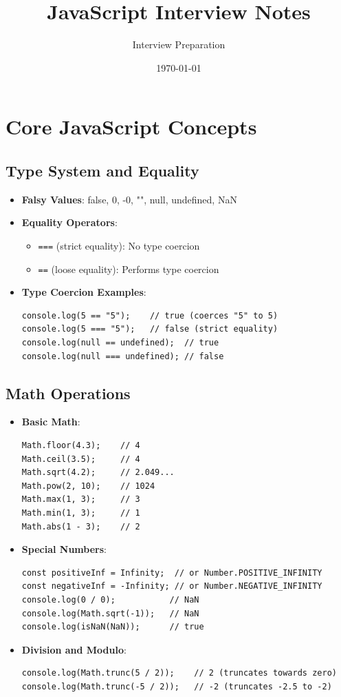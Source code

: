 \documentclass{article}
\title{JavaScript Interview Notes}
\author{Interview Preparation}
\date{\today}
\begin{document}
\maketitle
\tableofcontents

\section{Core JavaScript Concepts}

\subsection{Type System and Equality}
\begin{itemize}
    \item \textbf{Falsy Values}: false, 0, -0, "", null, undefined, NaN
    \item \textbf{Equality Operators}:
    \begin{itemize}
        \item \texttt{===} (strict equality): No type coercion
        \item \texttt{==} (loose equality): Performs type coercion
    \end{itemize}
    \item \textbf{Type Coercion Examples}:
    \begin{lstlisting}
console.log(5 == "5");    // true (coerces "5" to 5)
console.log(5 === "5");   // false (strict equality)
console.log(null == undefined);  // true
console.log(null === undefined); // false
    \end{lstlisting}
\end{itemize}

\subsection{Math Operations}
\begin{itemize}
    \item \textbf{Basic Math}:
    \begin{lstlisting}
Math.floor(4.3);    // 4
Math.ceil(3.5);     // 4
Math.sqrt(4.2);     // 2.049...
Math.pow(2, 10);    // 1024
Math.max(1, 3);     // 3
Math.min(1, 3);     // 1
Math.abs(1 - 3);    // 2
    \end{lstlisting}
    
    \item \textbf{Special Numbers}:
    \begin{lstlisting}
const positiveInf = Infinity;  // or Number.POSITIVE_INFINITY
const negativeInf = -Infinity; // or Number.NEGATIVE_INFINITY
console.log(0 / 0);           // NaN
console.log(Math.sqrt(-1));   // NaN
console.log(isNaN(NaN));      // true
    \end{lstlisting}
    
    \item \textbf{Division and Modulo}:
    \begin{lstlisting}
console.log(Math.trunc(5 / 2));    // 2 (truncates towards zero)
console.log(Math.trunc(-5 / 2));   // -2 (truncates -2.5 to -2)
    \end{lstlisting}
\end{itemize}
\end{document}
